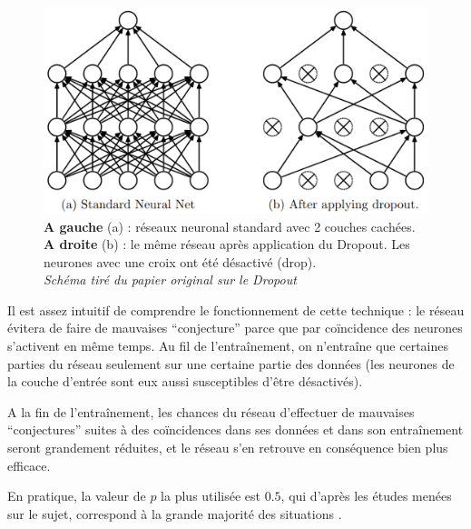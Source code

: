 \begin{figure}
    \centering
    \includegraphics[width=1\textwidth]{images/dropout.png}
    \caption{\textbf{A gauche} (a) : réseaux neuronal standard avec 2 couches cachées. \textbf{A droite} (b) : le même réseau après application du Dropout. Les neurones avec une croix ont été désactivé (drop).
    \\\textit{Schéma tiré du papier original sur le Dropout} \cite{dropout}}
\end{figure}

\par
Il est assez intuitif de comprendre le fonctionnement de cette technique : le réseau évitera de faire de mauvaises ``conjecture'' parce que par coïncidence des neurones s'activent en même temps. Au fil de l'entraînement, on n'entraîne que certaines parties du réseau seulement sur une certaine partie des données (les neurones de la couche d'entrée sont eux aussi susceptibles d'être désactivés).
\par
A la fin de l'entraînement, les chances du réseau d'effectuer de mauvaises ``conjectures'' suites à des coïncidences dans ses données et dans son entraînement seront grandement réduites, et le réseau s'en retrouve en conséquence bien plus efficace.
\par
En pratique, la valeur de $p$ la plus utilisée est $0.5$, qui d'après les études menées sur le sujet, correspond à la grande majorité des situations \cite{dropout}. 